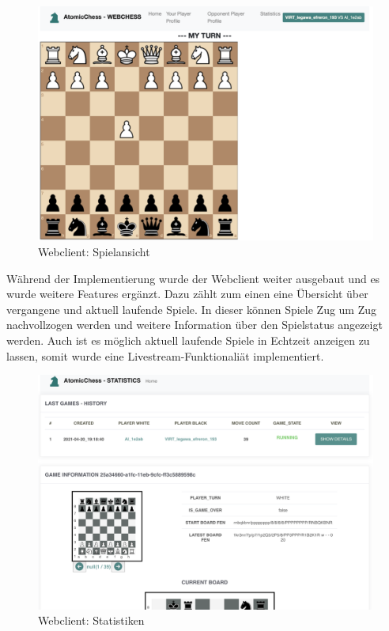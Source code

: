 \begin{figure}
\centering
\includegraphics{images/ATC_webclient.png}
\caption{Webclient: Spielansicht}
\end{figure}

Während der Implementierung wurde der Webclient weiter ausgebaut und es
wurde weitere Features ergänzt. Dazu zählt zum einen eine Übersicht über
vergangene und aktuell laufende Spiele. In dieser können Spiele Zug um
Zug nachvollzogen werden und weitere Information über den Spielstatus
angezeigt werden. Auch ist es möglich aktuell laufende Spiele in
Echtzeit anzeigen zu lassen, somit wurde eine Livestream-Funktionaliät
implementiert.

\begin{figure}
\centering
\includegraphics{images/ATC_statistics.png}
\caption{Webclient: Statistiken}
\end{figure}

